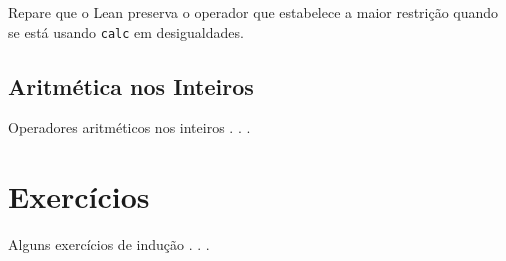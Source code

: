 Repare que o Lean preserva o operador que estabelece a maior restrição quando se está usando \lstinline{calc} em desigualdades.

\subsection{Aritmética nos Inteiros}

Operadores aritméticos nos inteiros . . .

\section{Exercícios}

Alguns exercícios de indução . . .
